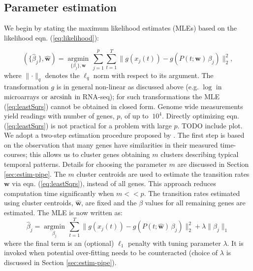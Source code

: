 \subsection{Parameter estimation}
\label{sec:parameter-estimation}

We begin by stating the maximum likelihood estimates (MLEs) based on the likelihood eqn. (\ref{eq:likelihood}):

\begin{equation}
  \label{eq:leastSqrs}
  (\lbrace\hat{\beta}_j\rbrace, \hat{\mathbf{w}}) =  \underset{\lbrace\beta_j\rbrace, \mathbf{w}}{\operatorname{argmin}} \, \sum_{j=1}^p \sum_{t=1}^T \lVert g(x_j(t)) - g\left(P(t; \mathbf{w})\,\beta_j \right) \rVert_2^2,%
\end{equation}
where $\lVert \cdot \rVert_q$ denotes the $\ell_q$ norm with respect to its argument.
The transformation $g$ is in general non-linear as discussed above (e.g. $\log$ in microarrays or $\operatorname{arcsinh}$ in RNA-seq); for such transformations the MLE (\ref{eq:leastSqrs}) cannot be obtained in closed form. Genome wide measurements yield readings with number of genes, $p$, of up to $~10^4$. Directly optimizing eqn. (\ref{eq:leastSqrs}) is not practical for a problem with large $p$. {\color{red} TODO include  plot}. We adopt a two-step estimation procedure proposed by \cite{Armond:2013}. The first step is based on the observation that many genes have similarities in their measured time-courses; this allows us to cluster genes obtaining $m$ clusters describing typical temporal patterns. Details for choosing the parameter $m$ are discussed in Section \ref{sec:estim-pipe}. The $m$ cluster centroids are used to estimate the transition rates $\mathbf{w}$ via eqn. (\ref{eq:leastSqrs}), instead of all genes. This approach reduces computation time significantly when $m << p$. 
The transition rates estimated using cluster centroids, $\hat{\mathbf{w}}$, are fixed and the $\beta$ values for all remaining genes are estimated. The MLE is now written as:
\begin{equation}
  \label{eq:leastSqrs.indep}
\hat{\beta}_j  =  \underset{\beta_j}{\operatorname{argmin}} \, \sum_{t=1}^T \lVert g(x_j(t)) - g\left(P(t; \hat{\mathbf{w}})\,\beta_j \right) \rVert_2^2 + \lambda \lVert \beta_j \rVert_1
\end{equation}
where the final term is an (optional) $\ell_1$ penalty with tuning parameter $\lambda$. It is invoked when potential over-fitting needs to be counteracted (choice of $\lambda$ is discussed in Section \ref{sec:estim-pipe}). 

